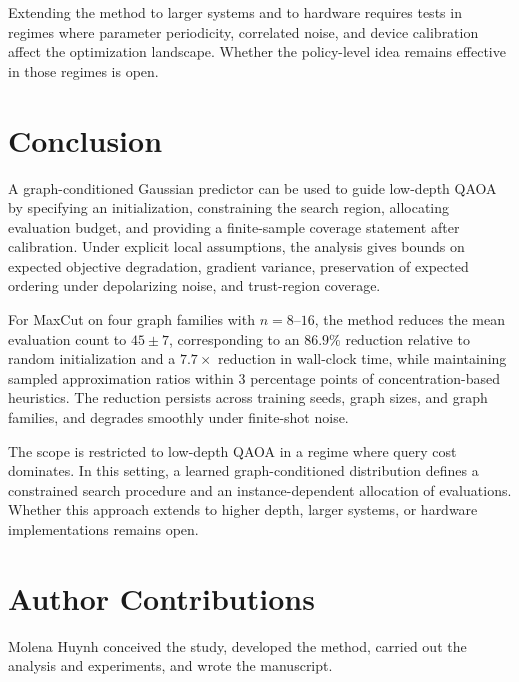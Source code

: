 \documentclass[aps,prx,reprint,superscriptaddress,longbibliography]{revtex4-2}
\newcommand{\QAOA}{\textnormal{\textsc{QAOA}}}
\begin{document}
Extending the method to larger systems and to hardware requires tests
in regimes where parameter periodicity, correlated noise, and device
calibration affect the optimization landscape. Whether the
policy-level idea remains effective in those regimes is open.

\section{Conclusion}
\label{sec:conclusion}

A graph-conditioned Gaussian predictor can be used to guide
low-depth \QAOA{} by specifying an initialization, constraining the
search region, allocating evaluation budget, and providing a
finite-sample coverage statement after calibration. Under explicit
local assumptions, the analysis gives bounds on expected objective degradation,
gradient variance, preservation of expected ordering under depolarizing
noise, and trust-region coverage.

For MaxCut on four graph families with $n{=}8$--$16$, the method reduces
the mean evaluation count to $45\pm 7$, corresponding to an $86.9\%$
reduction relative to random initialization and a $7.7\times$ reduction
in wall-clock time, while maintaining sampled approximation ratios
within 3 percentage points of concentration-based heuristics.
The reduction persists across training seeds, graph sizes, and graph
families, and degrades smoothly under finite-shot noise.

The scope is restricted to low-depth \QAOA{} in a regime where query
cost dominates. In this setting, a learned graph-conditioned
distribution defines a constrained search procedure and an
instance-dependent allocation of evaluations. Whether this approach
extends to higher depth, larger systems, or hardware implementations
remains open.

\section*{Author Contributions}

Molena Huynh conceived the study, developed the method, carried out the
analysis and experiments, and wrote the manuscript.

\appendix
\end{document}
